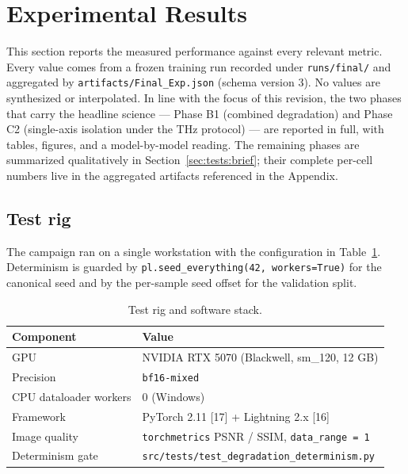 \section{Experimental Results}
\label{sec:tests}

This section reports the measured performance against every relevant metric.
Every value comes from a frozen training run recorded under
\texttt{runs/final/} and aggregated by \texttt{artifacts/Final\_Exp.json}
(schema version 3). No values are synthesized or interpolated. In line with
the focus of this revision, the two phases that carry the headline science ---
Phase B1 (combined degradation) and Phase C2 (single-axis isolation under the
THz protocol) --- are reported in full, with tables, figures, and a
model-by-model reading. The remaining phases are summarized qualitatively in
Section~\ref{sec:tests:brief}; their complete per-cell numbers live in the
aggregated artifacts referenced in the Appendix.

\subsection{Test rig}
\label{sec:tests:rig}
The campaign ran on a single workstation with the configuration in
Table~\ref{tab:rig}. Determinism is guarded by
\texttt{pl.seed\_everything(42, workers=True)} for the canonical seed and by
the per-sample seed offset for the validation split.

\begin{table}[htbp]
\centering
\caption{Test rig and software stack.}
\label{tab:rig}
\setlength{\tabcolsep}{4pt}
\renewcommand{\arraystretch}{1.1}
\begin{tabular}{ll}
\toprule
Component & Value \\
\midrule
GPU                & NVIDIA RTX 5070 (Blackwell, sm\_120, 12 GB) \\
Precision          & \texttt{bf16-mixed} \\
CPU dataloader workers & 0 (Windows) \\
Framework          & PyTorch 2.11 [17] + Lightning 2.x [16] \\
Image quality      & \texttt{torchmetrics} PSNR / SSIM, \texttt{data\_range = 1} \\
Determinism gate   & \texttt{src/tests/test\_degradation\_determinism.py} \\
\bottomrule
\end{tabular}
\end{table}


